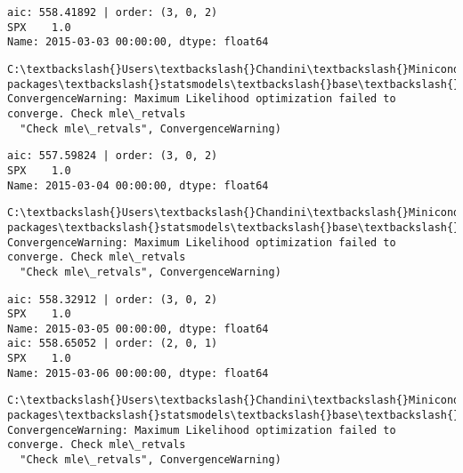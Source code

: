 \documentclass[11pt]{article}
\begin{document}
    \begin{Verbatim}[commandchars=\\\{\}]
aic: 558.41892 | order: (3, 0, 2)
SPX    1.0
Name: 2015-03-03 00:00:00, dtype: float64

    \end{Verbatim}

    \begin{Verbatim}[commandchars=\\\{\}]
C:\textbackslash{}Users\textbackslash{}Chandini\textbackslash{}Miniconda3\textbackslash{}envs\textbackslash{}auquan\textbackslash{}lib\textbackslash{}site-packages\textbackslash{}statsmodels\textbackslash{}base\textbackslash{}model.py:496: ConvergenceWarning: Maximum Likelihood optimization failed to converge. Check mle\_retvals
  "Check mle\_retvals", ConvergenceWarning)

    \end{Verbatim}

    \begin{Verbatim}[commandchars=\\\{\}]
aic: 557.59824 | order: (3, 0, 2)
SPX    1.0
Name: 2015-03-04 00:00:00, dtype: float64

    \end{Verbatim}

    \begin{Verbatim}[commandchars=\\\{\}]
C:\textbackslash{}Users\textbackslash{}Chandini\textbackslash{}Miniconda3\textbackslash{}envs\textbackslash{}auquan\textbackslash{}lib\textbackslash{}site-packages\textbackslash{}statsmodels\textbackslash{}base\textbackslash{}model.py:496: ConvergenceWarning: Maximum Likelihood optimization failed to converge. Check mle\_retvals
  "Check mle\_retvals", ConvergenceWarning)

    \end{Verbatim}

    \begin{Verbatim}[commandchars=\\\{\}]
aic: 558.32912 | order: (3, 0, 2)
SPX    1.0
Name: 2015-03-05 00:00:00, dtype: float64
aic: 558.65052 | order: (2, 0, 1)
SPX    1.0
Name: 2015-03-06 00:00:00, dtype: float64

    \end{Verbatim}

    \begin{Verbatim}[commandchars=\\\{\}]
C:\textbackslash{}Users\textbackslash{}Chandini\textbackslash{}Miniconda3\textbackslash{}envs\textbackslash{}auquan\textbackslash{}lib\textbackslash{}site-packages\textbackslash{}statsmodels\textbackslash{}base\textbackslash{}model.py:496: ConvergenceWarning: Maximum Likelihood optimization failed to converge. Check mle\_retvals
  "Check mle\_retvals", ConvergenceWarning)

    \end{Verbatim}
\end{document}
